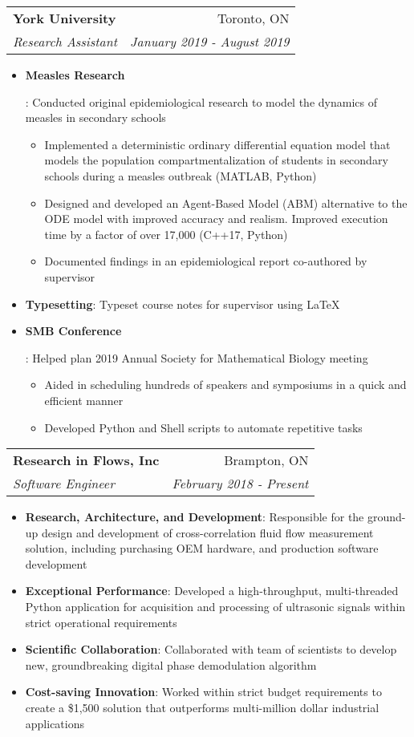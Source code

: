 \documentclass[letterpaper,10pt]{article}
\makeatletter
\newcommand{\resumeItem}[2]{
  \item\small{
    \textbf{#1}{: #2 \vspace{-2pt}}
  }
}
\newcommand{\resumeSubheading}[4]{
  \vspace{-1pt}\item[]
  \begin{tabular*}{0.98\textwidth}{l@{\extracolsep{\fill}}r}
      \hspace{-10pt}\textbf{#1} & #2 \\
      \hspace{-10pt}\textit{\small#3} & \textit{\small #4} \\
    \end{tabular*}\vspace{-5pt}
}
\newcommand{\resumeItemListStart}{\begin{itemize}}
\newcommand{\resumeItemListEnd}{\end{itemize}\vspace{-5pt}}
\makeatother
\begin{document}
    \resumeSubheading
      {York University}{Toronto, ON}
      {Research Assistant}{January 2019 - August 2019}
      \resumeItemListStart
        \resumeItem{Measles Research}
          {Conducted original epidemiological research to model the dynamics of measles in secondary schools
            \begin{itemize}
                \item Implemented a deterministic ordinary differential equation model that models the population compartmentalization of students in secondary schools during a measles outbreak (MATLAB, Python)
                \item Designed and developed an Agent-Based Model (ABM) alternative to the ODE model with improved accuracy and realism. Improved execution time by a factor of over 17,000 (C++17, Python)
                \item Documented findings in an epidemiological report co-authored by supervisor
            \end{itemize}
          }
        \resumeItem{Typesetting}
          {Typeset course notes for supervisor using \LaTeX{}}
        \resumeItem{SMB Conference}
          {Helped plan 2019 Annual Society for Mathematical Biology meeting
          \begin{itemize}
              \item Aided in scheduling hundreds of speakers and symposiums in a quick and efficient manner
              \item Developed Python and Shell scripts to automate repetitive tasks
          \end{itemize}
          }
      \resumeItemListEnd

    \resumeSubheading
      {Research in Flows, Inc}{Brampton, ON}
      {Software Engineer}{February 2018 - Present}
      \resumeItemListStart
        \resumeItem{Research, Architecture, and Development}
          {Responsible for the ground-up design and development of cross-correlation fluid flow measurement solution, including purchasing OEM hardware, and production software development}
        \resumeItem{Exceptional Performance}
          {Developed a high-throughput, multi-threaded Python application for acquisition and processing of ultrasonic signals within strict operational requirements}
        \resumeItem{Scientific Collaboration}
          {Collaborated with team of scientists to develop new, groundbreaking digital phase demodulation algorithm}
        \resumeItem{Cost-saving Innovation}
          {Worked within strict budget requirements to create a \$1,500 solution that outperforms multi-million dollar industrial applications}
      \resumeItemListEnd
\end{document}
